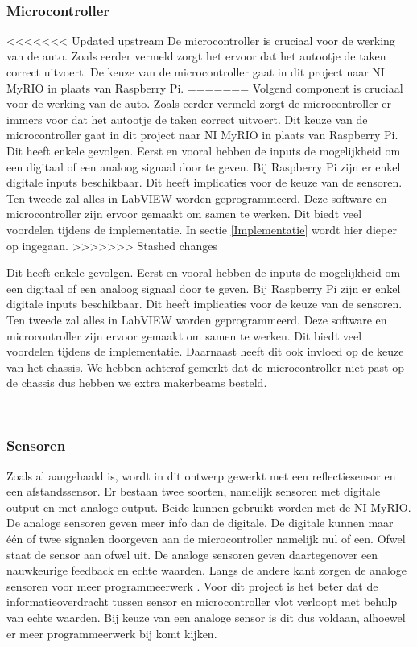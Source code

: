 \documentclass[a4paper,twoside,kulak]{kulakreport} %
\begin{document}
~
\subsubsection{Microcontroller}
<<<<<<< Updated upstream
De microcontroller is cruciaal voor de werking van de auto. Zoals eerder vermeld zorgt het ervoor dat het autootje de taken correct uitvoert. De keuze van de microcontroller gaat in dit project naar NI MyRIO in plaats van Raspberry Pi.
=======
Volgend component is cruciaal voor de werking van de auto. Zoals eerder vermeld zorgt de microcontroller er immers voor dat het autootje de taken correct uitvoert. Dit keuze van de microcontroller gaat in dit project naar NI MyRIO in plaats van Raspberry Pi. Dit heeft enkele gevolgen. 
Eerst en vooral hebben de inputs de mogelijkheid om een digitaal of een analoog signaal door te geven. Bij Raspberry Pi zijn er enkel digitale inputs beschikbaar. Dit heeft implicaties voor de keuze van de sensoren. Ten tweede zal alles in LabVIEW worden geprogrammeerd. Deze software en microcontroller zijn ervoor gemaakt om samen te werken. Dit biedt veel voordelen tijdens de implementatie. In sectie \ref{Implementatie} wordt hier dieper op ingegaan. %
>>>>>>> Stashed changes


Dit heeft enkele gevolgen.
Eerst en vooral hebben de inputs de mogelijkheid om een digitaal of een analoog signaal door te geven. Bij Raspberry Pi zijn er enkel digitale inputs beschikbaar. Dit heeft implicaties voor de keuze van de sensoren. Ten tweede zal alles in LabVIEW worden geprogrammeerd. Deze software en microcontroller zijn ervoor gemaakt om samen te werken. Dit biedt veel voordelen tijdens de implementatie. Daarnaast heeft dit ook invloed op de keuze van het chassis. We hebben achteraf gemerkt dat de microcontroller niet past op de chassis dus hebben we extra makerbeams besteld.

\label{Microcontroller}
~
\subsubsection{Sensoren}
Zoals al aangehaald is, wordt in dit ontwerp gewerkt met een reflectiesensor en een afstandssensor. Er bestaan twee soorten, namelijk sensoren met digitale output en met analoge output. Beide kunnen gebruikt worden met de NI MyRIO. De analoge sensoren geven meer info dan de digitale. De digitale kunnen maar één of twee signalen doorgeven aan de microcontroller namelijk nul of een. Ofwel staat de sensor aan ofwel uit. De analoge sensoren geven daartegenover een nauwkeurige feedback en echte waarden. Langs de andere kant zorgen de analoge sensoren voor meer programmeerwerk \cite{DigitaalOfAnaloog}. Voor dit project is het beter dat de informatieoverdracht tussen sensor en microcontroller vlot verloopt met behulp van echte waarden. Bij keuze van een analoge sensor is dit dus voldaan, alhoewel er meer programmeerwerk bij komt kijken. %
\end{document}
